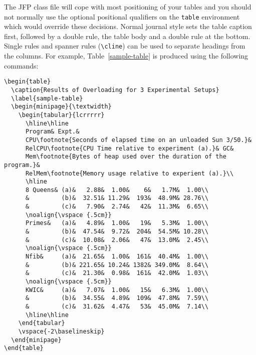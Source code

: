 \documentclass{jfp}
\begin{document}
The JFP class file will cope with most positioning of your tables
and you should not normally use the optional positional qualifiers on the
\verb"table" environment which would override these decisions.
Normal journal style sets the table caption first, followed by a double
rule, the table body and a double rule at the bottom. Single rules and
spanner rules (\verb"\cline") can be used to separate headings from the
columns. For example, Table~\ref{sample-table} is produced using the
following commands:\par
%
{\small
\begin{verbatim}
\begin{table}
  \caption{Results of Overloading for 3 Experimental Setups}
  \label{sample-table}
  \begin{minipage}{\textwidth}
    \begin{tabular}{lcrrrrr}
      \hline\hline
      Program& Expt.&
      CPU\footnote{Seconds of elapsed time on an unloaded Sun 3/50.}&
      RelCPU\footnote{CPU Time relative to experiment (a).}& GC&
      Mem\footnote{Bytes of heap used over the duration of the program.}&
      RelMem\footnote{Memory usage relative to experient (a).}\\
      \hline
      8 Queens& (a)&   2.88&  1.00&    6&   1.7M&  1.00\\
      &         (b)&  32.51& 11.29&  193&  48.9M& 28.76\\
      &         (c)&   7.90&  2.74&   42&  11.3M&  6.65\\
      \noalign{\vspace {.5cm}}
      Primes&   (a)&   4.89&  1.00&   19&   5.3M&  1.00\\
      &         (b)&  47.54&  9.72&  204&  54.5M& 10.28\\
      &         (c)&  10.08&  2.06&   47&  13.0M&  2.45\\
      \noalign{\vspace {.5cm}}
      Nfib&     (a)&  21.65&  1.00&  161&  40.4M&  1.00\\
      &         (b)& 221.65& 10.24& 1382& 349.0M&  8.64\\
      &         (c)&  21.30&  0.98&  161&  42.0M&  1.03\\
      \noalign{\vspace {.5cm}}
      KWIC&     (a)&   7.07&  1.00&   15&   6.3M&  1.00\\
      &         (b)&  34.55&  4.89&  109&  47.8M&  7.59\\
      &         (c)&  31.62&  4.47&   53&  45.0M&  7.14\\
      \hline\hline
    \end{tabular}
    \vspace{-2\baselineskip}
  \end{minipage}
\end{table}
\end{verbatim}}
\end{document}
